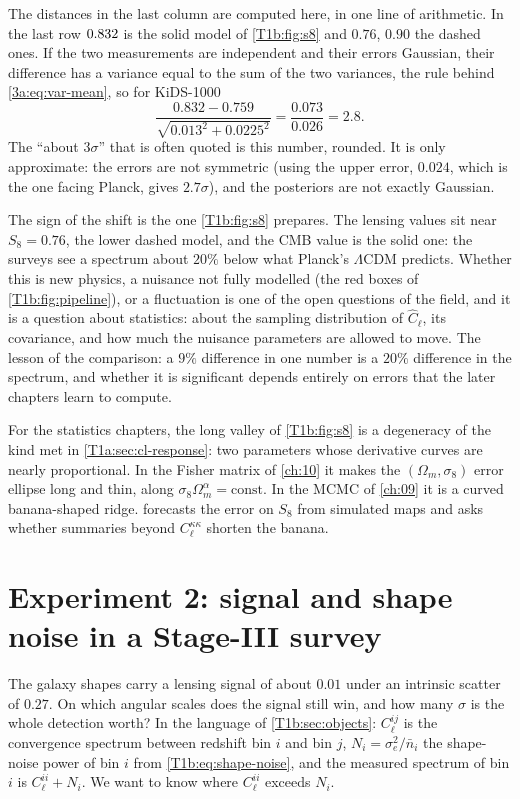 The distances in the last column are computed here, in one line of arithmetic. In the last row $0.832$ is the solid model of \cref{T1b:fig:s8} and $0.76$, $0.90$ the dashed ones. If the two measurements are independent and their errors Gaussian, their difference has a variance equal to the sum of the two variances, the rule behind \eqref{3a:eq:var-mean}, so for KiDS-1000
\[
\frac{0.832-0.759}{\sqrt{0.013^2+0.0225^2}}=\frac{0.073}{0.026}=2.8 .
\]
The ``about $3\sigma$'' that is often quoted is this number, rounded. It is only approximate: the errors are not symmetric (using the upper error, $0.024$, which is the one facing Planck, gives $2.7\sigma$), and the posteriors are not exactly Gaussian.

The sign of the shift is the one \cref{T1b:fig:s8} prepares. The lensing values sit near $S_8=0.76$, the lower dashed model, and the CMB value is the solid one: the surveys see a spectrum about $20\%$ below what Planck's $\Lambda$CDM predicts. Whether this is new physics, a nuisance not fully modelled (the red boxes of \cref{T1b:fig:pipeline}), or a fluctuation is one of the open questions of the field, and it is a question about statistics: about the sampling distribution of $\widehat C_\ell$, its covariance, and how much the nuisance parameters are allowed to move. The lesson of the comparison: a $9\%$ difference in one number is a $20\%$ difference in the spectrum, and whether it is significant depends entirely on errors that the later chapters learn to compute.

For the statistics chapters, the long valley of \cref{T1b:fig:s8} is a degeneracy of the kind met in \cref{T1a:sec:cl-response}: two parameters whose derivative curves are nearly proportional. In the Fisher matrix of \cref{ch:10} it makes the $(\Omega_m,\sigma_8)$ error ellipse long and thin, along $\sigma_8\Omega_m^\alpha=\text{const}$. In the MCMC of \cref{ch:09} it is a curved banana-shaped ridge.  forecasts the error on $S_8$ from simulated maps and asks whether summaries beyond $C_\ell^{\kappa\kappa}$ shorten the banana.

\section{Experiment 2: signal and shape noise in a Stage-III survey}
\label{T1b:sec:noise}

The galaxy shapes carry a lensing signal of about $0.01$ under an intrinsic scatter of $0.27$. On which angular scales does the signal still win, and how many $\sigma$ is the whole detection worth? In the language of \cref{T1b:sec:objects}: $C_\ell^{ij}$ is the convergence spectrum between redshift bin $i$ and bin $j$, $N_i=\sigma_e^2/\bar n_i$ the shape-noise power of bin $i$ from \eqref{T1b:eq:shape-noise}, and the measured spectrum of bin $i$ is $C_\ell^{ii}+N_i$. We want to know where $C_\ell^{ii}$ exceeds $N_i$.

